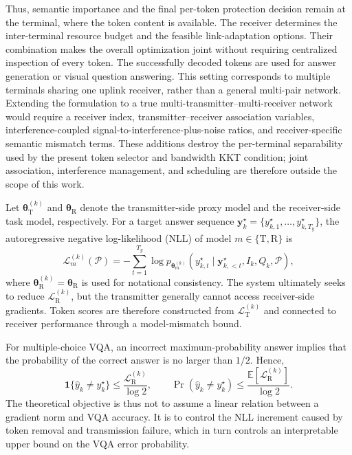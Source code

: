 \documentclass[journal]{IEEEtran}
\begin{document}
Thus, semantic importance and the final per-token protection decision remain at the terminal, where the token content is available. The receiver determines the inter-terminal resource budget and the feasible link-adaptation options. Their combination makes the overall optimization joint without requiring centralized inspection of every token. The successfully decoded tokens are used for answer generation or visual question answering. This setting corresponds to multiple terminals sharing one uplink receiver, rather than a general multi-pair network. Extending the formulation to a true multi-transmitter--multi-receiver network would require a receiver index, transmitter--receiver association variables, interference-coupled signal-to-interference-plus-noise ratios, and receiver-specific semantic mismatch terms. These additions destroy the per-terminal separability used by the present token selector and bandwidth KKT condition; joint association, interference management, and scheduling are therefore outside the scope of this work.

Let $\bm\theta_{\mathrm T}^{(k)}$ and $\bm\theta_{\mathrm R}$ denote the transmitter-side proxy model and the receiver-side task model, respectively. For a target answer sequence $\bm y_k^\star=\{y_{k,1}^\star,\ldots,y_{k,T_y}^\star\}$, the autoregressive negative log-likelihood (NLL) of model $m\in\{\mathrm T,\mathrm R\}$ is
\begin{equation}
\mathcal L_m^{(k)}(\mathcal P)
=-
\sum_{t=1}^{T_y}
\log p_{\bm\theta_m^{(k)}}
\!\left(
y_{k,t}^\star\mid \bm y_{k,<t}^\star,I_k,Q_k,\mathcal P
\right),
\label{eq:task_loss}
\end{equation}
where $\bm\theta_{\mathrm R}^{(k)}=\bm\theta_{\mathrm R}$ is used for notational consistency. The system ultimately seeks to reduce $\mathcal L_{\mathrm R}^{(k)}$, but the transmitter generally cannot access receiver-side gradients. Token scores are therefore constructed from $\mathcal L_{\mathrm T}^{(k)}$ and connected to receiver performance through a model-mismatch bound.

For multiple-choice VQA, an incorrect maximum-probability answer implies that the probability of the correct answer is no larger than $1/2$. Hence,
\begin{equation}
\mathbf 1\{\widehat y_k\neq y_k^\star\}
\leq \frac{\mathcal L_{\mathrm R}^{(k)}}{\log 2},
\qquad
\Pr(\widehat y_k\neq y_k^\star)
\leq \frac{\mathbb E[\mathcal L_{\mathrm R}^{(k)}]}{\log 2}.
\label{eq:vqa_error_bound}
\end{equation}
The theoretical objective is thus not to assume a linear relation between a gradient norm and VQA accuracy. It is to control the NLL increment caused by token removal and transmission failure, which in turn controls an interpretable upper bound on the VQA error probability.
\end{document}
